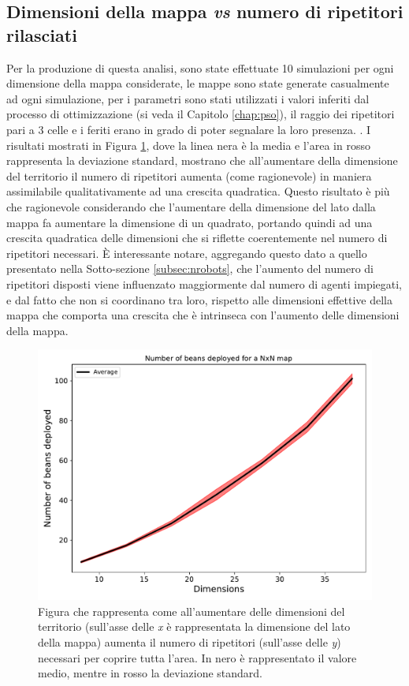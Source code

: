 \subsection{Dimensioni della mappa \textit{vs} numero di ripetitori rilasciati}
Per la produzione di questa analisi, sono state effettuate 10 simulazioni per ogni dimensione della mappa considerate, le mappe sono state generate casualmente ad ogni simulazione, per i parametri sono stati utilizzati i valori inferiti dal processo di ottimizzazione (si veda il Capitolo \ref{chap:pso}), il raggio dei ripetitori pari a 3 celle e i feriti erano in grado di poter segnalare la loro presenza. .
I risultati mostrati in Figura \ref{fig:beans}, dove la linea nera è la media e l'area in rosso rappresenta la deviazione standard, mostrano che all'aumentare della dimensione del territorio il numero di ripetitori aumenta (come ragionevole) in maniera assimilabile qualitativamente ad una crescita quadratica.
Questo risultato è più che ragionevole considerando che l'aumentare della dimensione del lato dalla mappa fa aumentare la dimensione di un quadrato, portando quindi ad una crescita quadratica delle dimensioni che si riflette coerentemente nel numero di ripetitori necessari.
È interessante notare, aggregando questo dato a quello presentato nella Sotto-sezione \ref{subsec:nrobots}, che l'aumento del numero di ripetitori disposti viene influenzato maggiormente dal numero di agenti impiegati, e dal fatto che non si coordinano tra loro, rispetto alle dimensioni effettive della mappa che comporta una crescita che è intrinseca con l'aumento delle dimensioni della mappa.
\begin{figure}
	\centering
	\includegraphics[width=0.9\linewidth]{images/macro_results/beans}
	\caption{Figura che rappresenta come all'aumentare delle dimensioni del territorio (sull'asse delle \textit{x} è rappresentata la dimensione del lato della mappa) aumenta il numero di ripetitori (sull'asse delle \textit{y}) necessari per coprire tutta l'area. In nero è rappresentato il valore medio, mentre in rosso la deviazione standard.}
	\label{fig:beans}
\end{figure}

